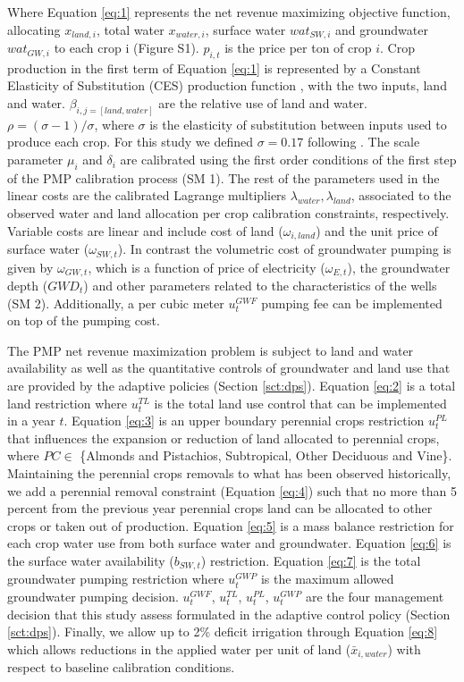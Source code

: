 \documentclass[a4paper,fleqn]{cas-sc}
\begin{document}
Where Equation \ref{eq:1} represents the net revenue maximizing objective function, allocating $x_{land,i}$, total water $x_{water,i}$, surface water $wat_{SW,i}$ and groundwater $wat_{GW,i}$ to each crop i (Figure S1). $p_{i,t}$ is the price per ton of crop $i$. Crop production in the first term of Equation \ref{eq:1} is represented by a Constant Elasticity of Substitution (CES) production function \citep{debertin_agricultural_2012,merel_fully_2010}, with the two inputs, land and water.  $\beta_{i,j=[land,water]}$ are the relative use of land and water. $\rho = (\sigma-1)/\sigma$, where $\sigma$ is the elasticity of substitution between inputs used to produce each crop. For this study we defined $\sigma = 0.17$ following \citet{howitt_calibrating_2012}. The scale parameter $\mu_{i}$ and $\delta_{i}$ are calibrated using the first order conditions of the first step of the PMP calibration process (SM 1). The rest of the parameters used in the linear costs are the calibrated Lagrange multipliers $\lambda_{water},\lambda_{land}$, associated to the observed water and land allocation per crop calibration constraints, respectively. Variable costs are linear and include cost of land ($\omega_{i,land}$) and the unit price of surface water ($\omega_{SW,t}$). In contrast the volumetric cost of groundwater pumping is given by $\omega_{GW,t}$, which is a function of price of electricity ($\omega_{E,t}$), the groundwater depth ($GWD_t$) and other parameters related to the characteristics of the wells (SM 2). Additionally, a per cubic meter $u^{GWF}_{t}$ pumping fee can be implemented on top of the pumping cost.

The PMP net revenue maximization problem is subject to land and water availability as well as the quantitative controls of groundwater and land use that are provided by the adaptive policies (Section \ref{sct:dps}). Equation \ref{eq:2} is a total land restriction where $u^{TL}_{t}$ is the total land use control that can be implemented in a year $t$. Equation \ref{eq:3} is an upper boundary perennial crops restriction $u^{PL}_{t}$ that influences the expansion or reduction of land allocated to perennial crops, where $PC \in$ \{Almonds and Pistachios, Subtropical, Other Deciduous and Vine\}. Maintaining the perennial crops removals to what has been observed historically, we add a perennial removal constraint (Equation \ref{eq:4}) such that no more than 5 percent from the previous year perennial crops land can be allocated to other crops or taken out of production. Equation \ref{eq:5} is a mass balance restriction for each crop water use from both surface water and groundwater. Equation \ref{eq:6} is the surface water availability ($b_{SW,t}$) restriction. Equation \ref{eq:7} is the total groundwater pumping restriction where $u^{GWP}_{t}$ is the maximum allowed groundwater pumping decision. $u^{GWF}_{t}$, $u^{TL}_{t}$, $u^{PL}_{t}$, $u^{GWP}_{t}$ are the four management decision that this study assess formulated in the adaptive control policy (Section \ref{sct:dps}).  Finally, we allow up to 2\% deficit irrigation through Equation \ref{eq:8} which allows reductions in the applied water per  unit of land ($\bar{x}_{i,water}$) with respect to baseline calibration conditions. 
\end{document}
